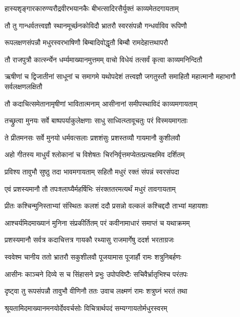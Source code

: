 \twolineshloka
{हास्यशृङ्गारकारुण्यरौद्रवीरभयानकैः}
{बीभत्सादिरसैर्युक्तं काव्यमेतदगायताम्} %

\twolineshloka
{तौ तु गान्धर्वतत्त्वज्ञौ स्थानमूर्च्छनकोविदौ}
{भ्रातरौ स्वरसंपन्नौ गन्धर्वाविव रूपिणौ} %

\twolineshloka
{रूपलक्षणसंपन्नौ मधुरस्वरभाषिणौ}
{बिम्बादिवोद्धृतौ बिम्बौ रामदेहात्तथापरौ} %

\twolineshloka
{तौ राजपुत्रौ कार्त्स्न्येन धर्म्यमाख्यानमुत्तमम्}
{वाचो विधेयं तत्सर्वं कृत्वा काव्यमनिन्दितौ} %

\threelineshloka
{ऋषीणां च द्विजातीनां साधूनां च समागमे}
{यथोपदेशं तत्त्वज्ञौ जगतुस्तौ समाहितौ}
{महात्मानौ महाभागौ सर्वलक्षणलक्षितौ} %

\twolineshloka
{तौ कदाचित्समेतानामृषीणां भावितात्मनाम्}
{आसीनानां समीपस्थाविदं काव्यमगायताम्} %

\twolineshloka
{तच्छ्रुत्वा मुनयः सर्वे बाष्पपर्याकुलेक्षणाः}
{साधु साध्वित्य्तावूचतुः परं विस्मयमागताः} %

\twolineshloka
{ते प्रीतमनसः सर्वे मुनयो धर्मवत्सलाः}
{प्रशशंसुः प्रशस्तव्यौ गायमानौ कुशीलवौ} %

\twolineshloka
{अहो गीतस्य माधुर्यं श्लोकानां च विशेषतः}
{चिरनिर्वृत्तमप्येतत्प्रत्यक्षमिव दर्शितम्} %

\twolineshloka
{प्रविश्य तावुभौ सुष्ठु तदा भावमगायताम्}
{सहितौ मधुरं रक्तं संपन्नं स्वरसंपदा} %

\twolineshloka
{एवं प्रशस्यमानौ तौ तपःश्लाघ्यैर्महर्षिभिः}
{संरक्ततरमत्यर्थं मधुरं तावगायताम्} %

\twolineshloka
{प्रीतः कश्चिन्मुनिस्ताभ्यां संस्थितः कलशं ददौ}
{प्रसन्नो वल्कलं कश्चिद्ददौ ताभ्यां महायशाः} %

\twolineshloka
{आश्चर्यमिदमाख्यानं मुनिना संप्रकीर्तितम्}
{परं कवीनामाधारं समाप्तं च यथाक्रमम्} %

\twolineshloka
{प्रशस्यमानौ सर्वत्र कदाचित्तत्र गायकौ}
{रथ्यासु राजमार्गेषु ददर्श भरताग्रजः} %

\twolineshloka
{स्ववेश्म चानीय ततो भ्रातरौ सकुशीलवौ}
{पूजयामास पूजार्हौ रामः शत्रुनिबर्हणः} %

\twolineshloka
{आसीनः काञ्चने दिव्ये स च सिंहासने प्रभुः}
{उपोपविष्टैः सचिवैर्भ्रातृभिश्च परंतपः} %

\twolineshloka
{दृष्ट्वा तु रूपसंपन्नौ तावुभौ वीणिनौ ततः}
{उवाच लक्ष्मणं रामः शत्रुघ्नं भरतं तथा} %

\twolineshloka
{श्रूयतामिदमाख्यानमनयोर्देववर्चसोः}
{विचित्रार्थपदं सम्यग्गायतोर्मधुरस्वरम्} %

